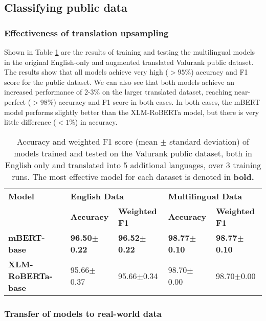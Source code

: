 \documentclass{l4proj}
\begin{document}
\subsection{Classifying public data}
\subsubsection{Effectiveness of translation upsampling}  \hfill \par
Shown in Table \ref{table:backtranslation-effectiveness} are the results of training and testing the multilingual models in the original English-only and augmented translated Valurank public dataset. The results show that all models achieve very high ($>95\%$) accuracy and F1 score for the public dataset. We can also see that both models achieve an increased performance of 2-3\% on the larger translated dataset, reaching near-perfect ($>98\%$) accuracy and F1 score in both cases. In both cases, the mBERT model performs slightly better than the XLM-RoBERTa model, but there is very little difference ($<1\%$) in accuracy.

\begin{table}[]
\begin{tabular}{lllll}
\hline
\textbf{Model}   & \multicolumn{2}{l}{\textbf{English Data}} & \multicolumn{2}{l}{\textbf{Multilingual Data}} \\ \cline{2-5} 
                 & \textbf{Accuracy}    & \textbf{Weighted F1}   & \textbf{Accuracy}   & \textbf{Weighted F1}   \\ \hline 
\textbf{mBERT-base}       & \textbf{96.50$\pm$0.22}    & \textbf{96.52$\pm$0.22}          & \textbf{98.77$\pm$0.10}       & \textbf{98.77$\pm$0.10}          \\
\textbf{XLM-RoBERTa-base} & 95.66$\pm$0.37    & 95.66$\pm$0.34          & 98.70$\pm$0.00       & 98.70$\pm$0.00   
     \\ \hline
\end{tabular}
\caption{Accuracy and weighted F1 score (mean $\pm$ standard deviation) of models trained and tested on the Valurank public dataset, both in English only and translated into 5 additional languages, over 3 training runs. The most effective model for each dataset is denoted in \textbf{bold.}}
\label{table:backtranslation-effectiveness}
\end{table}

\subsubsection{Transfer of models to real-world data}  \hfill \par
\end{document}
